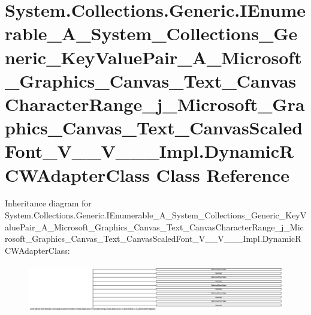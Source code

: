 \hypertarget{class_system_1_1_collections_1_1_generic_1_1_i_enumerable___a___system___collections___generic__6514869bf4314fa00bf45c5513041441}{}\section{System.\+Collections.\+Generic.\+I\+Enumerable\+\_\+\+A\+\_\+\+System\+\_\+\+Collections\+\_\+\+Generic\+\_\+\+Key\+Value\+Pair\+\_\+\+A\+\_\+\+Microsoft\+\_\+\+Graphics\+\_\+\+Canvas\+\_\+\+Text\+\_\+\+Canvas\+Character\+Range\+\_\+j\+\_\+\+Microsoft\+\_\+\+Graphics\+\_\+\+Canvas\+\_\+\+Text\+\_\+\+Canvas\+Scaled\+Font\+\_\+\+V\+\_\+\+\_\+\+V\+\_\+\+\_\+\+\_\+\+Impl.\+Dynamic\+R\+C\+W\+Adapter\+Class Class Reference}
\label{class_system_1_1_collections_1_1_generic_1_1_i_enumerable___a___system___collections___generic__6514869bf4314fa00bf45c5513041441}
Inheritance diagram for System.\+Collections.\+Generic.\+I\+Enumerable\+\_\+\+A\+\_\+\+System\+\_\+\+Collections\+\_\+\+Generic\+\_\+\+Key\+Value\+Pair\+\_\+\+A\+\_\+\+Microsoft\+\_\+\+Graphics\+\_\+\+Canvas\+\_\+\+Text\+\_\+\+Canvas\+Character\+Range\+\_\+j\+\_\+\+Microsoft\+\_\+\+Graphics\+\_\+\+Canvas\+\_\+\+Text\+\_\+\+Canvas\+Scaled\+Font\+\_\+\+V\+\_\+\+\_\+\+V\+\_\+\+\_\+\+\_\+\+Impl.\+Dynamic\+R\+C\+W\+Adapter\+Class\+:\begin{figure}[H]
\begin{center}
\leavevmode
\includegraphics[height=2.144847cm]{class_system_1_1_collections_1_1_generic_1_1_i_enumerable___a___system___collections___generic__6514869bf4314fa00bf45c5513041441}
\end{center}
\end{figure}
